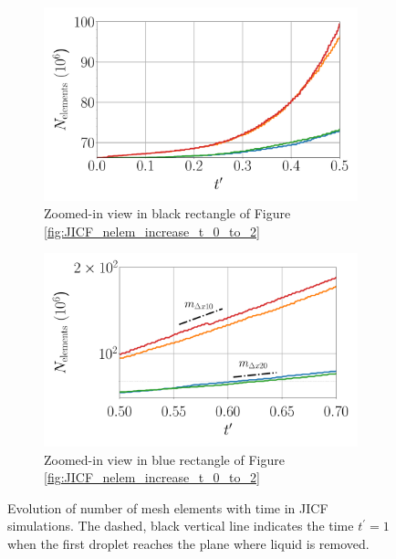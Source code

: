 \begin{figure}[ht]
\begin{subfigure}[b]{0.45\textwidth}
   \includegraphics[scale=0.25]{./part2_developments/figures_ch5_resolved_JICF/JICF_nelem_evolution/JICF_nelem_increase_t_in_0_0p5}
   \caption{Zoomed-in view in black rectangle of Figure \ref{fig:JICF_nelem_increase_t_0_to_2}}
   \label{fig:JICF_nelem_increase_t_0_to_0p5} 
\end{subfigure}
\hfill
\begin{subfigure}[b]{0.45\textwidth}
	\centering
   \includegraphics[scale=0.25]{./part2_developments/figures_ch5_resolved_JICF/JICF_nelem_evolution/JICF_nelem_increase_t_in_0p5_1}
   \caption{Zoomed-in view in blue rectangle of Figure \ref{fig:JICF_nelem_increase_t_0_to_2}}
   \label{fig:JICF_nelem_increase_t_0p5_to_0p7}
\end{subfigure}
   \caption{Evolution of number of mesh elements with time in JICF simulations. The dashed, black vertical line indicates the time $t^\prime = 1$ when the first droplet reaches the plane where liquid is removed.}
\label{fig:JICF_nelem_increase}
\end{figure}




